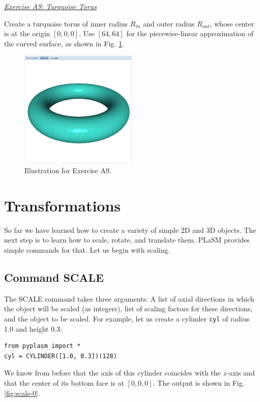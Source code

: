 \documentclass[article,A4,12pt]{llncs}
\begin{document}
\noindent
\underline{\em Exercise A9: Turquoise Torus}

Create a turquoise torus of inner radius $R_{in}$ and outer radius $R_{out}$, whose center 
is at the origin $[0, 0, 0]$. Use $[64, 64]$ for the piecewise-linear approximation 
of the curved surface, as shown in Fig. \ref{fig:a9}.

\newpage

\begin{figure}[!ht]
\begin{center}
\includegraphics[width=0.5\textwidth]{img/a9-turquoise-torus.png}
\end{center}
\vspace{-2mm}
\caption{Illustration for Exercise A9.}
\label{fig:a9}
\vspace{-1cm}
\end{figure}

\section{Transformations}

So far we have learned how to create a variety of simple 2D and 3D objects. 
The next step is to learn how to scale, rotate, and translate them. PLaSM
provides simple commands for that. Let us begin with scaling.

\subsection{Command SCALE}

The SCALE command takes three arguments: A list of axial directions in which 
the object will be scaled (as integers), list of scaling factors for these 
directions, and the object to be scaled. For example, let us create a cylinder 
{\tt cyl} of radius 1.0 and height 0.3:

\begin{verbatim}
from pyplasm import *
cyl = CYLINDER([1.0, 0.3])(128)
\end{verbatim}
We know from before that the axis of this cylinder coincides with the $z$-axis 
and that the center of its bottom face is at $[0, 0, 0]$. The output is shown in Fig. \ref{fig:scale-0}.
\end{document}
